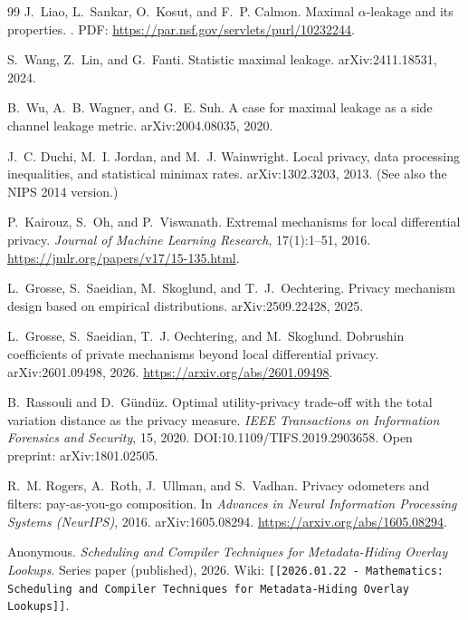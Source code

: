 \documentclass[11pt]{article}
\begin{document}
\begin{thebibliography}{99}
J.~Liao, L.~Sankar, O.~Kosut, and F.~P. Calmon.
\newblock Maximal $\alpha$-leakage and its properties.
. PDF: \url{https://par.nsf.gov/servlets/purl/10232244}.

S.~Wang, Z.~Lin, and G.~Fanti.
\newblock Statistic maximal leakage.
\newblock arXiv:2411.18531, 2024.

B.~Wu, A.~B. Wagner, and G.~E. Suh.
\newblock A case for maximal leakage as a side channel leakage metric.
\newblock arXiv:2004.08035, 2020.

J.~C. Duchi, M.~I. Jordan, and M.~J. Wainwright.
\newblock Local privacy, data processing inequalities, and statistical minimax rates.
\newblock arXiv:1302.3203, 2013.
\newblock (See also the NIPS 2014 version.)

P.~Kairouz, S.~Oh, and P.~Viswanath.
\newblock Extremal mechanisms for local differential privacy.
\newblock \emph{Journal of Machine Learning Research}, 17(1):1--51, 2016.
\newblock \url{https://jmlr.org/papers/v17/15-135.html}.

L.~Grosse, S.~Saeidian, M.~Skoglund, and T.~J.~Oechtering.
\newblock Privacy mechanism design based on empirical distributions.
\newblock arXiv:2509.22428, 2025.

L.~Grosse, S.~Saeidian, T.~J. Oechtering, and M.~Skoglund.
\newblock Dobrushin coefficients of private mechanisms beyond local differential privacy.
\newblock arXiv:2601.09498, 2026. \url{https://arxiv.org/abs/2601.09498}.


B.~Rassouli and D.~G\"und\"uz.
\newblock Optimal utility-privacy trade-off with the total variation distance as the privacy measure.
\newblock \emph{IEEE Transactions on Information Forensics and Security}, 15, 2020.
\newblock DOI:10.1109/TIFS.2019.2903658.
\newblock Open preprint: arXiv:1801.02505.

R.~M. Rogers, A.~Roth, J.~Ullman, and S.~Vadhan.
\newblock Privacy odometers and filters: pay-as-you-go composition.
\newblock In \emph{Advances in Neural Information Processing Systems (NeurIPS)}, 2016.
\newblock arXiv:1605.08294. \url{https://arxiv.org/abs/1605.08294}.

Anonymous.
\newblock \emph{Scheduling and Compiler Techniques for Metadata-Hiding Overlay Lookups}.
\newblock Series paper (published), 2026.
\newblock Wiki: \texttt{[[2026.01.22 - Mathematics: Scheduling and Compiler Techniques for Metadata-Hiding Overlay Lookups]]}.



\end{thebibliography}
\end{document}
